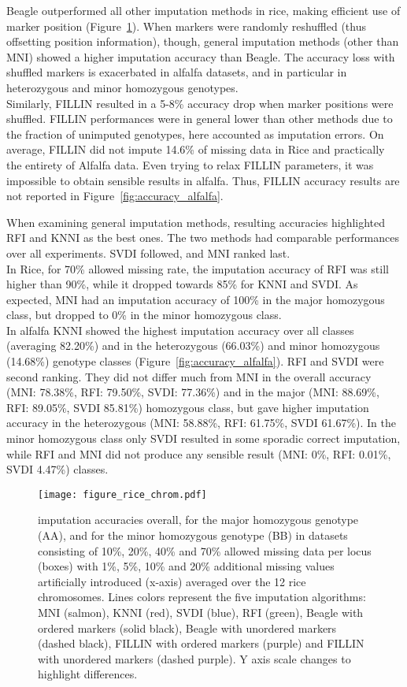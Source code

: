 Beagle outperformed all other imputation methods in rice, making efficient use of marker position (Figure~\ref{fig:accuracy_rice}). When markers were randomly reshuffled (thus offsetting position information), though, general imputation methods (other than MNI) showed a higher imputation accuracy than Beagle. The accuracy loss with shuffled markers is exacerbated in alfalfa datasets, and in particular in heterozygous and minor homozygous genotypes.\\
Similarly, FILLIN resulted in a 5-8\% accuracy drop when marker positions were shuffled. FILLIN performances were in general lower than other methods due to the fraction of unimputed genotypes, here accounted as imputation errors. On average, FILLIN did not impute 14.6\% of missing data in Rice and practically the entirety of Alfalfa data. Even trying to relax FILLIN parameters, it was impossible to obtain sensible results in alfalfa. Thus, FILLIN accuracy results are not reported in Figure~\ref{fig:accuracy_alfalfa}.

When examining general imputation methods, resulting accuracies highlighted RFI and KNNI as the best ones. The two methods had comparable performances over all experiments. SVDI followed, and MNI ranked last.\\
In Rice, for 70\% allowed missing rate, the imputation accuracy of RFI was still higher than 90\%, while it dropped towards 85\% for KNNI and SVDI. As expected, MNI had an imputation accuracy of 100\% in the major homozygous class, but dropped to 0\% in the minor homozygous class.\\
In alfalfa KNNI showed the highest imputation accuracy over all classes (averaging 82.20\%) and in the heterozygous (66.03\%) and minor homozygous (14.68\%) genotype classes (Figure~\ref{fig:accuracy_alfalfa}). RFI and SVDI were second ranking. They did not differ much from MNI in the overall accuracy (MNI: 78.38\%, RFI: 79.50\%, SVDI: 77.36\%) and in the major (MNI: 88.69\%, RFI: 89.05\%, SVDI 85.81\%) homozygous class, but gave higher imputation accuracy in the heterozygous (MNI: 58.88\%, RFI: 61.75\%, SVDI 61.67\%). In the minor homozygous class only SVDI resulted in some sporadic correct imputation, while RFI and MNI did not produce any sensible result (MNI: 0\%, RFI: 0.01\%, SVDI 4.47\%) classes. 

\begin{figure}
\texttt{[image: figure\_rice\_chrom.pdf]}
\caption[Rice imputation accuracies]{
imputation accuracies overall, for the major homozygous genotype (AA), and for the minor homozygous genotype (BB) in datasets consisting of 10\%, 20\%, 40\% and 70\% allowed missing data per locus (boxes) with 1\%, 5\%, 10\% and 20\% additional missing values artificially introduced (x-axis) averaged over the 12 rice chromosomes. Lines colors represent the five imputation algorithms: MNI (salmon), KNNI (red), SVDI (blue), RFI (green), Beagle with ordered markers (solid black), Beagle with unordered markers (dashed black), FILLIN with ordered markers (purple) and FILLIN with unordered markers (dashed purple). Y axis scale changes to highlight differences.}
\label{fig:accuracy_rice}
\end{figure}

